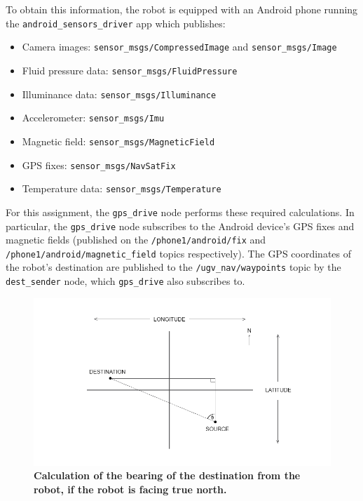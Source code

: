\documentclass[titlepage,12pt,a4paper]{article}
\begin{document}
To obtain this information, the robot is equipped with an Android phone running the \verb|android_sensors_driver| app which publishes:

\begin{itemize}
	\item Camera images: \verb|sensor_msgs/CompressedImage| and \verb|sensor_msgs/Image|
	\item Fluid pressure data: \verb|sensor_msgs/FluidPressure|
	\item Illuminance data: \verb|sensor_msgs/Illuminance|
	\item Accelerometer: \verb|sensor_msgs/Imu|
	\item Magnetic field: \verb|sensor_msgs/MagneticField|
	\item GPS fixes: \verb|sensor_msgs/NavSatFix|
	\item Temperature data: \verb|sensor_msgs/Temperature| \\
\end{itemize}

For this assignment, the \verb|gps_drive| node performs these required calculations. In particular, the \verb|gps_drive| node subscribes to the Android device's GPS fixes and magnetic fields (published on the \verb|/phone1/android/fix| and \verb|/phone1/android/magnetic_field| topics respectively). The GPS coordinates of the robot's destination are published to the  \verb|/ugv_nav/waypoints| topic by the \verb|dest_sender| node, which \verb|gps_drive| also subscribes to.

\pagebreak

\begin{figure}[h]
	\centering
	\includegraphics[scale=0.6]{figures/bearings.png}
	\caption{\textbf{Calculation of the bearing of the destination from the robot, if the robot is facing true north.}}
	\label{figure:bearing1}
\end{figure}
\end{document}
